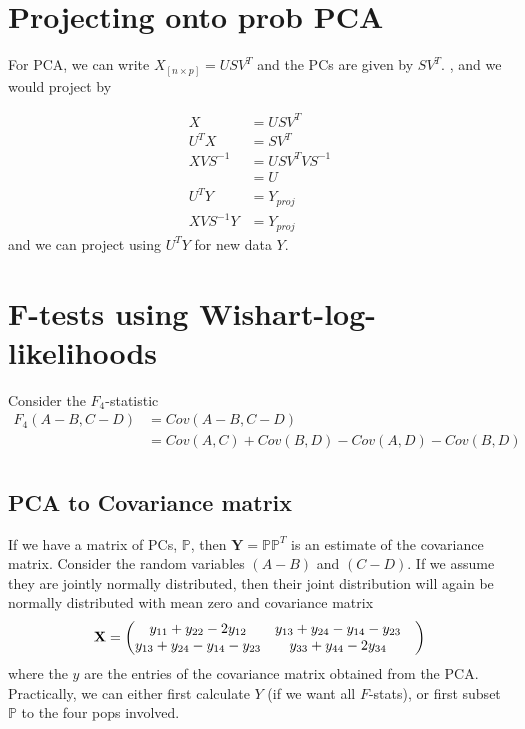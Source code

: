\documentclass[12pt, letterpaper]{article}
\newcommand{\BP}{\mathbb{P}}
\begin{document}
\section{Projecting onto prob PCA}

For PCA, we can write $X_{[n \times p]} = USV^T$ and the PCs are given by $SV^T$. , and we would project by


\begin{align}
    X &= USV^T \\
    U^T X &= SV^T \\
    XVS^{-1} &= USV^TVS^{-1} \\
    &= U \\
    U^T Y &= Y_{proj}\\
    XVS^{-1}Y &= Y_{proj}
\end{align}
and we can project using $U^TY $ for new data $Y$. 


\newpage
\section{F-tests using Wishart-log-likelihoods}
Consider the $F_4$-statistic
\begin{align}
    F_4(A-B, C-D)&= Cov(A-B, C-D)\\ &= Cov(A, C) + Cov(B,D) - Cov(A,D) - Cov(B,D)\\
\end{align}


\subsection{PCA to Covariance matrix}
If we have a matrix of PCs, $\BP$, then $\mathbf{Y} = \BP\BP^T$ is an estimate of the covariance matrix. Consider the random variables $(A-B)$ and $(C-D)$. If we assume they are jointly normally distributed, then their joint distribution will again be normally distributed with mean zero and covariance matrix 
\begin{equation}
    \bf{X} = \begin{pmatrix} 
    y_{11} + y_{22} - 2 y_{12} & y_{13} + y_{24} - y_{14} - y_{23} \\
    y_{13} + y_{24} - y_{14} - y_{23} & y_{33} + y_{44} - 2 y_{34} &  \\
    \end{pmatrix}
\end{equation}
where the $y$ are the entries of the  covariance matrix obtained from the PCA. Practically, we can either first calculate $Y$ (if we want all $F$-stats), or first subset $\BP$ to the four pops involved.
\end{document}
